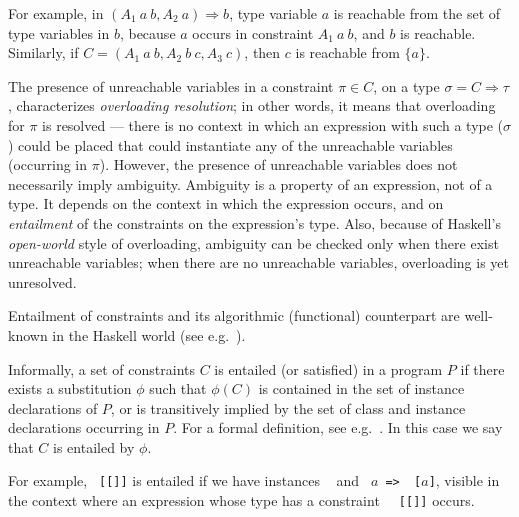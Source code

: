 For example, in $(A_1\: a\: b, A_2\: a) \Rightarrow b$, type variable
$a$ is reachable from the set of type variables in $b$, because $a$
occurs in constraint $A_1\: a\: b$, and $b$ is reachable. Similarly,
if $C = (A_1\: a\: b, A_2\: b\: c, A_3\: c)$, then $c$ is reachable
from $\{a\}$.

The presence of unreachable variables in a constraint $\pi\in C$, on a
type $\sigma = C \Rightarrow \tau$, characterizes {\em overloading
  resolution\/}; in other words, it means that overloading for $\pi$
is resolved  --- there is no context in which an
expression with such a type ($\sigma$) could be placed that could
instantiate any of the unreachable variables (occurring in
$\pi$). However, the presence of unreachable variables does not
necessarily imply ambiguity. Ambiguity is a property of an expression,
not of a type. It depends on the context in which the expression
occurs, and on \textit{entailment\/} of the constraints on the expression's type.
Also, because of Haskell's {\em open-world\/} style of overloading,
ambiguity can be checked only when there exist unreachable variables;
when there are no unreachable variables, overloading is yet unresolved.


Entailment of constraints and its algorithmic (functional) counterpart
are well-known in the Haskell world (see
e.g.~\cite{MarkJones94a,TheoryOfOverloading,JBCS-Ambiguity-and-constrained-polymorphism}).

Informally, a set of constraints $C$ is entailed (or satisfied) in a
program $P$ if there exists a substitution $\phi$ such that $\phi(C)$
is contained in the set of instance declarations of $P$, or is
transitively implied by the set of class and instance declarations
occurring in $P$. For a formal definition, see
e.g.~\cite{MarkJones94a,JBCS-Ambiguity-and-constrained-polymorphism}. In
this case we say that $C$ is entailed by $\phi$.

For example, {\tt \Eq\ [[\Integer]]} is entailed if we have instances
{\tt \Eq\ \Integer} and {\tt \Eq\ $a$ => \Eq\ [$a$]}, visible in the
context where an expression whose type has a constraint {\tt
  \Eq\ [[\Integer]]} occurs.

